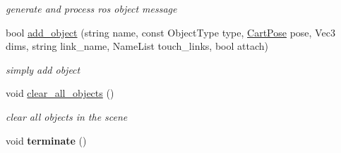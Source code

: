 \begin{DoxyCompactItemize}
\begin{DoxyCompactList}\small\item\em generate and process ros object message \end{DoxyCompactList}\item 
bool \hyperlink{class_r_n_b_1_1_moveit_compact_1_1_planner_a89a057666f1c30a49d5219879107b435}{add\+\_\+object} (string name, const Object\+Type type, \hyperlink{class_r_n_b_1_1_moveit_compact_1_1_cart_pose}{Cart\+Pose} pose, Vec3 dims, string link\+\_\+name, Name\+List touch\+\_\+links, bool attach)
\begin{DoxyCompactList}\small\item\em simply add object \end{DoxyCompactList}\item 
void \hyperlink{class_r_n_b_1_1_moveit_compact_1_1_planner_aeefb7ff47ed61db1e6cc2427c37d8ae2}{clear\+\_\+all\+\_\+objects} ()
\begin{DoxyCompactList}\small\item\em clear all objects in the scene \end{DoxyCompactList}\item 
\mbox{\label{class_r_n_b_1_1_moveit_compact_1_1_planner_a8c3e7920f191d102357b61f969faebbb}} 
void {\bfseries terminate} ()
\end{DoxyCompactItemize}
